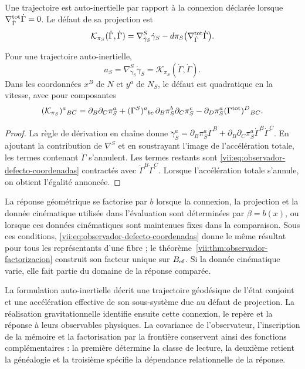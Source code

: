 \begin{definition}
\label{vii:def:observador-autoinercia}
Une trajectoire est auto-inertielle par rapport à la connexion déclarée
lorsque \(\nabla^{\rm tot}_{\dot\Gamma}\dot\Gamma=0\).
Le défaut de sa projection est
\begin{equation}
 \mathcal K_{\pi_S}(\dot\Gamma,\dot\Gamma)
 =\nabla^S_{\dot\gamma_S}\dot\gamma_S
  -d\pi_S\bigl(\nabla^{\rm tot}_{\dot\Gamma}\dot\Gamma\bigr).
 \label{vii:eq:observador-defecto-proyeccion}
\end{equation}
\end{definition}

\begin{proposition}
\label{vii:prop:observador-aceleracion}
Pour une trajectoire auto-inertielle,
\[
 a_S=\nabla^S_{\dot\gamma_S}\dot\gamma_S
     =\mathcal K_{\pi_S}(\dot\Gamma,\dot\Gamma).
\]
Dans les coordonnées \(x^B\) de \(N\) et \(y^a\) de \(N_S\), le
défaut est quadratique en la vitesse, avec pour composantes
\begin{equation}
 (\mathcal K_{\pi_S})^a{}_{BC}
 =\partial_B\partial_C\pi_S^a
  +(\Gamma^S)^a{}_{bc}\,
        \partial_B\pi_S^b\partial_C\pi_S^c
  -\partial_D\pi_S^a(\Gamma^{\rm tot})^D{}_{BC}.
 \label{vii:eq:observador-defecto-coordenadas}
\end{equation}
\end{proposition}

\begin{proof}
La règle de dérivation en chaîne donne \(\ddot\gamma_S^a=\partial_B\pi_S^a\ddot\Gamma^B
 +\partial_B\partial_C\pi_S^a\dot\Gamma^B\dot\Gamma^C\). En ajoutant la contribution de \(\nabla^S\) et en soustrayant l'image de l'accélération totale, les termes contenant \(\ddot\Gamma\) s'annulent. Les termes restants sont \eqref{vii:eq:observador-defecto-coordenadas} contractés avec \(\dot\Gamma^B\dot\Gamma^C\). Lorsque l'accélération totale s'annule, on obtient l'égalité annoncée.
\end{proof}

La réponse géométrique se factorise par \(b\) lorsque la connexion,
la projection et la donnée cinématique utilisée dans l'évaluation sont
déterminées par \(\beta=b(x)\), ou lorsque ces données cinématiques sont
maintenues fixes dans la comparaison. Sous ces conditions,
\eqref{vii:eq:observador-defecto-coordenadas} donne le même résultat
pour tous les représentants d'une fibre ; le
théorème~\ref{vii:thm:observador-factorizacion} construit son facteur
unique sur \(B_{\rm ef}\). Si la donnée cinématique varie, elle
fait partie du domaine de la réponse comparée.

La formulation auto-inertielle décrit une trajectoire géodésique de
l'état conjoint et une accélération effective de son sous-système due
au défaut de projection. La réalisation gravitationnelle identifie
ensuite cette connexion, le repère et la réponse à leurs observables
physiques. La covariance de l'observateur, l'inscription de la mémoire et
la factorisation par la frontière conservent ainsi des fonctions complémentaires :
la première détermine la classe de lecture, la deuxième retient la
généalogie et la troisième spécifie la dépendance relationnelle de la
réponse.
